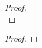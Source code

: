 \documentclass{article}
\newenvironment{problem}[2][Problem]{\begin{trivlist}
\item[\hskip \labelsep {\bfseries #1}\hskip \labelsep {\bfseries #2.}]}{\end{trivlist}}
\begin{document}
\begin{proof} \text{} \\
\end{proof}

\pagebreak

\begin{problem}{6}
\end{problem}

\begin{proof} \text{\\}
\end{proof}

\pagebreak

\begin{problem}{7}
\end{problem}
\end{document}
